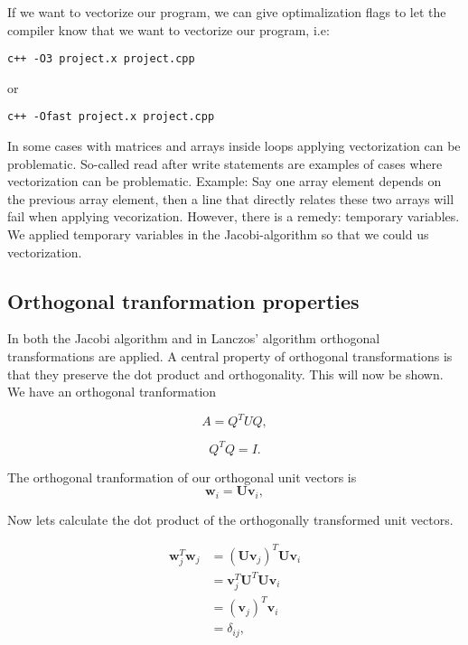 \documentclass{article}
\begin{document}
If we want to vectorize our program, we can give optimalization flags to let the compiler know that we want to vectorize our program, i.e:
\begin{lstlisting}
c++ -O3 project.x project.cpp
\end{lstlisting}
or 
\begin{lstlisting}
c++ -Ofast project.x project.cpp
\end{lstlisting}

In some cases with matrices and arrays inside loops applying vectorization can be problematic. So-called read after write statements are examples of cases where vectorization can be problematic. Example: Say one array element depends on the previous array element, then a line that directly relates these two arrays will fail when applying vecorization. However, there is a remedy: temporary variables. We applied temporary variables in the Jacobi-algorithm so that we could us vectorization.

\subsection{Orthogonal tranformation properties}
In both the Jacobi algorithm and in Lanczos' algorithm orthogonal transformations are applied. A central property of orthogonal transformations is that they preserve the dot product and orthogonality. This will now be shown.\\

We have an orthogonal tranformation

\begin{equation}
A = Q^T U Q,
\end{equation}

\begin{equation}
Q^T Q = I.
\end{equation}

The orthogonal tranformation of our orthogonal unit vectors is
\[
\mathbf{w}_i=\mathbf{U}\mathbf{v}_i,
\]

Now lets calculate the dot product of the orthogonally transformed unit vectors.

\begin{subequations} 
	\begin{align}
	\mathbf{w}_j^T \mathbf{w}_j &= (\mathbf{U v}_j)^T \mathbf{U v}_i\\
	&= \mathbf{v}_j^T \mathbf{U}^T \mathbf{U} \mathbf{v}_i \\
	&= (\mathbf{v}_j)^T \mathbf{v}_i\\
	&= \delta_{ij},
	\end{align}
\end{subequations}
\end{document}
